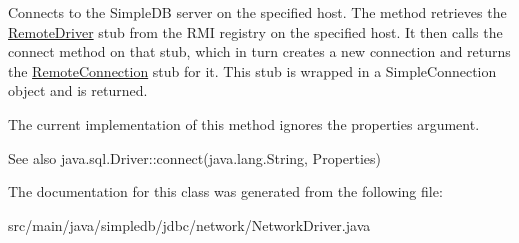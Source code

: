 Connects to the Simple\+DB server on the specified host. The method retrieves the \hyperlink{interfacesimpledb_1_1jdbc_1_1network_1_1RemoteDriver}{Remote\+Driver} stub from the R\+MI registry on the specified host. It then calls the connect method on that stub, which in turn creates a new connection and returns the \hyperlink{interfacesimpledb_1_1jdbc_1_1network_1_1RemoteConnection}{Remote\+Connection} stub for it. This stub is wrapped in a Simple\+Connection object and is returned. 

The current implementation of this method ignores the properties argument. \begin{DoxySeeAlso}{See also}
java.\+sql.\+Driver\+::connect(java.\+lang.\+String, Properties) 
\end{DoxySeeAlso}


The documentation for this class was generated from the following file\+:\begin{DoxyCompactItemize}
\item 
src/main/java/simpledb/jdbc/network/Network\+Driver.\+java\end{DoxyCompactItemize}

